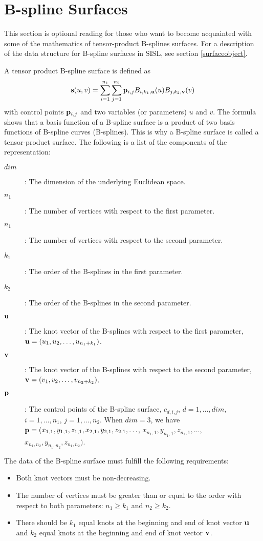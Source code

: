 \section{B-spline Surfaces}

This section is optional reading for those who want to
become acquainted with some of the mathematics of
tensor-product B-splines surfaces. For a description of the data structure for
B-spline surfaces in SISL, see section \ref{surfaceobject}.

A tensor product B-spline surface is defined as
\[{\bf s}(u,v) = \sum_{i=1}^{n_1}\sum_{j=1}^{n_2}{\bf p}_{i,j} 
	B_{i,k_1,{\bf u}}(u) B_{j,k_2,{\bf v}}(v) \]
with control points ${\bf p}_{i,j}$ and two variables
(or parameters) $u$ and $v$.
The formula shows that a basis function of a B-spline surface is a
product of two basis functions of B-spline curves (B-splines).
This is why a B-spline surface is called a tensor-product surface.
The following is a list of the components of the representation:
\begin{description}
\item[$dim$]: The dimension of the underlying Euclidean space.
\item[$n_1$]: The number of vertices with respect to the first parameter.
\item[$n_1$]: The number of vertices with respect to the second parameter.
\item[$k_1$]: The order of the B-splines in the first parameter.
\item[$k_2$]: The order of the B-splines in the second parameter.
\item[${\bf u}$]: The knot vector of the B-splines with respect to
                  the first parameter,
                  ${\bf u} = (u_1,u_2,\ldots,u_{n_1+k_1})$.
\item[${\bf v}$]: The knot vector of the B-splines with respect to
                  the second parameter,
                  ${\bf v} = (v_1,v_2,\ldots,v_{n_2+k_2})$.
\item[${\bf p}$]: The control points of the B-spline surface,
           $c_{d,i,j}$, $d=1,\ldots,dim$, $i=1,\ldots,n_1$,
		$j=1,\ldots,n_2$.
	When $dim = 3$, we have
          ${\bf p} = (x_{1,1},y_{1,1},z_{1,1},x_{2,1},y_{2,1},z_{2,1},\ldots$,
                  $x_{n_1,1},y_{n_1,1},z_{n_1,1},\ldots$,
                     $x_{n_1,n_2},y_{n_1,n_2},z_{n_1,n_2})$.
\end{description}

The data of the B-spline surface must fulfill the following requirements:
\begin{itemize}
\item
Both knot vectors must be non-decreasing.
\item
The number of vertices must be greater than or equal to the order
with respect to both parameters: $n_1 \ge k_1$ and $n_2 \ge k_2$.
\item
There should be $k_1$ equal knots at the beginning and end 
of knot vector ${\bf u}$ and $k_2$ equal knots at the beginning and
end of knot vector ${\bf v}$.
\end{itemize}

